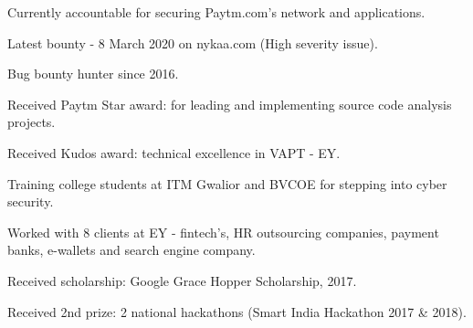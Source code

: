 

\cvsubsection{}

  \begin{cvitems} %
    \item {Currently accountable for securing Paytm.com's network and applications.}
    \item {Latest bounty - 8 March 2020 on nykaa.com (High severity issue).}
    \item {Bug bounty hunter since 2016.}
    \item {Received Paytm Star award: for leading and implementing source code analysis projects.}
    \item {Received Kudos award: technical excellence in VAPT - EY.}
    \item {Training college students at ITM Gwalior and BVCOE for stepping into cyber security.}
    \item {Worked with 8 clients at EY - fintech’s, HR outsourcing companies, payment banks, e-wallets and search engine company.}
    \item {Received scholarship: Google Grace Hopper Scholarship, 2017.}
    \item {Received 2nd prize: 2 national hackathons (Smart India Hackathon 2017 \& 2018).}

  \end{cvitems}